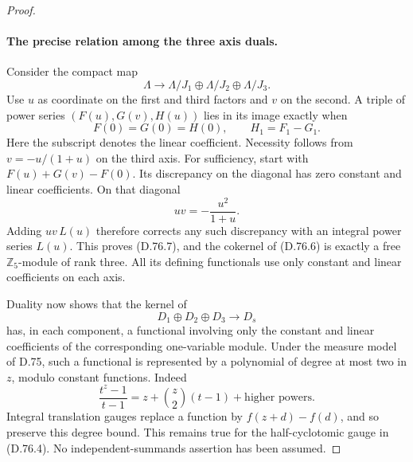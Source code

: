 \begin{proof}
\paragraph{The precise relation among the three axis duals.}
Consider the compact map
\[
 \Lambda\longrightarrow
       \Lambda/J_1\oplus\Lambda/J_2\oplus\Lambda/J_3.
                                                               \tag{D.76.6}
\]
Use \(u\) as coordinate on the first and third factors
and \(v\) on the second. A triple of power series
\((F(u),G(v),H(u))\) lies in its image exactly when
\[
 F(0)=G(0)=H(0),\qquad
                      H_1=F_1-G_1.                    \tag{D.76.7}
\]
Here the subscript denotes the linear coefficient.
Necessity follows from \(v=-u/(1+u)\) on the third axis.
For sufficiency, start with \(F(u)+G(v)-F(0)\).
Its discrepancy on the diagonal has zero constant and
linear coefficients. On that diagonal
\[
                         uv=-\frac{u^2}{1+u}.
 \]
Adding \(uv\,L(u)\) therefore corrects any such discrepancy
with an integral power series \(L(u)\).
This proves (D.76.7), and the cokernel of (D.76.6) is
exactly a free \(\mathbb Z_5\)-module of rank three.
All its defining functionals use only constant and linear
coefficients on each axis.

Duality now shows that the kernel of
\[
                       D_1\oplus D_2\oplus D_3
                             \longrightarrow D_s             \tag{D.76.8}
\]
has, in each component, a functional involving only the
constant and linear coefficients of the corresponding
one-variable module. Under the measure model of D.75,
such a functional is represented by a polynomial of degree
at most two in \(z\), modulo constant functions. Indeed
\[
       \frac{t^z-1}{t-1}
                =z+\binom z2(t-1)+\text{higher powers}.
                                                               \tag{D.76.9}
\]
Integral translation gauges replace a function by
\(f(z+d)-f(d)\), and so preserve this degree bound.
This remains true for the half-cyclotomic gauge in (D.76.4).
No independent-summands assertion has been assumed.


\end{proof}
